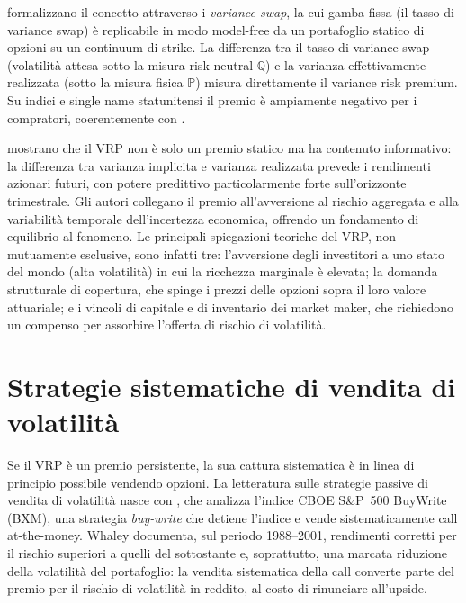 \citet{carr2009variance} formalizzano il concetto attraverso i
\emph{variance swap}, la cui gamba fissa (il tasso di variance swap) è
replicabile in modo model-free da un portafoglio statico di opzioni su un
continuum di strike. La differenza tra il tasso di variance swap
(volatilità attesa sotto la misura risk-neutral $\mathbb{Q}$) e la varianza
effettivamente realizzata (sotto la misura fisica $\mathbb{P}$) misura
direttamente il variance risk premium. Su indici e single name statunitensi
il premio è ampiamente negativo per i compratori, coerentemente con
\citet{bakshi2003delta}.

\citet{bollerslev2009expected} mostrano che il VRP non è solo un premio
statico ma ha contenuto informativo: la differenza tra varianza implicita e
varianza realizzata prevede i rendimenti azionari futuri, con potere
predittivo particolarmente forte sull'orizzonte trimestrale. Gli autori
collegano il premio all'avversione al rischio aggregata e alla variabilità
temporale dell'incertezza economica, offrendo un fondamento di equilibrio
al fenomeno. Le principali spiegazioni teoriche del VRP, non
mutuamente esclusive, sono infatti tre: l'avversione degli investitori a
uno stato del mondo (alta volatilità) in cui la ricchezza marginale è
elevata; la domanda strutturale di copertura, che spinge i prezzi delle
opzioni sopra il loro valore attuariale; e i vincoli di capitale e di
inventario dei market maker, che richiedono un compenso per assorbire
l'offerta di rischio di volatilità.

\section{Strategie sistematiche di vendita di volatilità}
\label{sec:lit-short-vol}

Se il VRP è un premio persistente, la sua cattura sistematica è in linea di
principio possibile vendendo opzioni. La letteratura sulle strategie
passive di vendita di volatilità nasce con \citet{whaley2002return}, che
analizza l'indice CBOE S\&P~500 BuyWrite (BXM), una strategia
\emph{buy-write} che detiene l'indice e vende sistematicamente call
at-the-money. Whaley documenta, sul periodo 1988--2001, rendimenti
corretti per il rischio superiori a quelli del sottostante e, soprattutto,
una marcata riduzione della volatilità del portafoglio: la vendita
sistematica della call converte parte del premio per il rischio di
volatilità in reddito, al costo di rinunciare all'upside.

